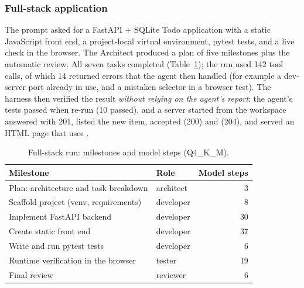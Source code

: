 \subsubsection*{Full-stack application}
The prompt asked for a FastAPI + SQLite Todo application with a static JavaScript front end, a project-local virtual environment, pytest tests, and a live check in the browser. The Architect produced a plan of five milestones plus the automatic review. All seven tasks completed (Table~\ref{tab:fs}); the run used 142 tool calls, of which 14 returned errors that the agent then handled (for example a dev-server port already in use, and a mistaken selector in a browser test). The harness then verified the result \emph{without relying on the agent's report}: the agent's tests passed when re-run (10 passed), and a server started from the workspace answered  with 201, listed the new item, accepted  (200) and  (204), and served an HTML page that uses .

\begin{table}[t]
\centering\small
\begin{tabular}{llr}
\toprule \textbf{Milestone} & \textbf{Role} & \textbf{Model steps}\\\midrule
Plan: architecture and task breakdown & architect & 3\\
Scaffold project (venv, requirements) & developer & 8\\
Implement FastAPI backend & developer & 30\\
Create static front end & developer & 37\\
Write and run pytest tests & developer & 6\\
Runtime verification in the browser & tester & 19\\
Final review & reviewer & 6\\\bottomrule
\end{tabular}
\caption{Full-stack run: milestones and model steps (Q4\_K\_M).}\label{tab:fs}
\end{table}


